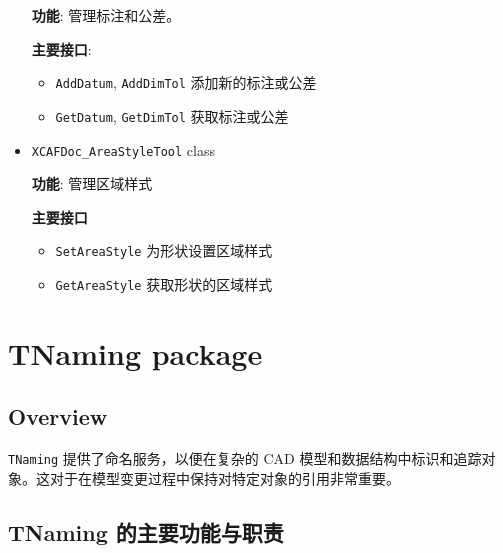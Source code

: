 \documentclass[11pt]{article}
\begin{document}
\begin{itemize}
\textbf{功能}: 管理标注和公差。

\textbf{主要接口}:

\begin{itemize}
\item \texttt{AddDatum}, \texttt{AddDimTol} 添加新的标注或公差
\item \texttt{GetDatum}, \texttt{GetDimTol} 获取标注或公差
\end{itemize}

\item \texttt{XCAFDoc\_AreaStyleTool} class

\textbf{功能}: 管理区域样式

\textbf{主要接口}

\begin{itemize}
\item \texttt{SetAreaStyle} 为形状设置区域样式
\item \texttt{GetAreaStyle} 获取形状的区域样式
\end{itemize}
\end{itemize}
\section{TNaming package}
\label{sec:orgfd61bb6}

\subsection{Overview}
\label{sec:org19e1c4d}

\texttt{TNaming} 提供了命名服务，以便在复杂的 CAD 模型和数据结构中标识和追踪对象。这对于在模型变更过程中保持对特定对象的引用非常重要。
\subsection{TNaming 的主要功能与职责}
\label{sec:orgb1f2909}
\end{document}
